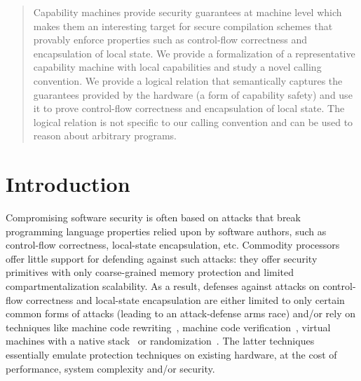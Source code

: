 \documentclass[format=acmsmall, review=true, screen=true]{acmart}
\begin{document}
\author{Lars~Birkedal}

\maketitle

\begin{abstract}
  Capability machines provide security guarantees at machine level which makes
  them an interesting target for secure compilation schemes that provably
  enforce properties such as control-flow correctness and encapsulation of local
  state. We provide a formalization of a representative capability machine with
  local capabilities and study a novel calling convention.  We provide a logical
  relation that semantically captures the guarantees provided by the hardware (a
  form of capability safety) and use it to prove control-flow correctness and
  encapsulation of local state.  The logical relation is not specific to our
  calling convention and can be used to reason about arbitrary programs.
\end{abstract}



\section{Introduction}
\label{sec:introduction}

Compromising software security is often based on attacks that break programming
language properties relied upon by software authors, such as control-flow
correctness, local-state encapsulation, etc. Commodity processors offer little
support for defending against such attacks: they offer security primitives with
only coarse-grained memory protection and limited compartmentalization
scalability. As a result, defenses against attacks on control-flow correctness
and local-state encapsulation are either limited to only certain common forms of
attacks (leading to an attack-defense arms race) and/or rely on techniques like
machine code rewriting~\citep{wahbe_efficient_1993,abadi_control-flow_2005}, machine code
verification~\citep{morrisett_system_1999}, virtual machines with a
native stack~\citep{lindholm_java_2014} or
randomization~\citep{forrest_building_1997}. The latter techniques essentially
emulate protection techniques on existing hardware, at the cost of performance,
system complexity and/or security.
\end{document}
